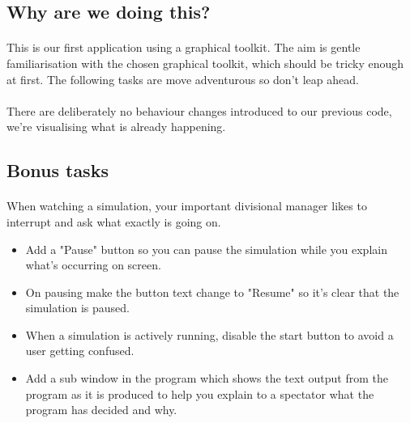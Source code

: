 \documentclass[11pt]{book}
\begin{document}
\subsection{Why are we doing this?}

\paragraph{} This is our first application using a graphical toolkit. The aim
is gentle familiarisation with the chosen graphical toolkit, which should be
tricky enough at first. The following tasks are move adventurous so don't leap
ahead.

\paragraph{} There are deliberately no behaviour changes introduced to our
previous code, we're visualising what is already happening.

\subsection{Bonus tasks}

\paragraph{} When watching a simulation, your important divisional manager
likes to interrupt and ask what exactly is going on.

\begin{itemize}
\item Add a "Pause" button so you can pause the simulation while you explain what's occurring on screen.
\item On pausing make the button text change to "Resume" so it's clear that the simulation is paused.
\item When a simulation is actively running, disable the start button to avoid a user getting confused.
\item Add a sub window in the program which shows the text output from the program as it is produced to help you explain to a spectator what the program has decided and why.
\end{itemize}

\clearpage
\end{document}
